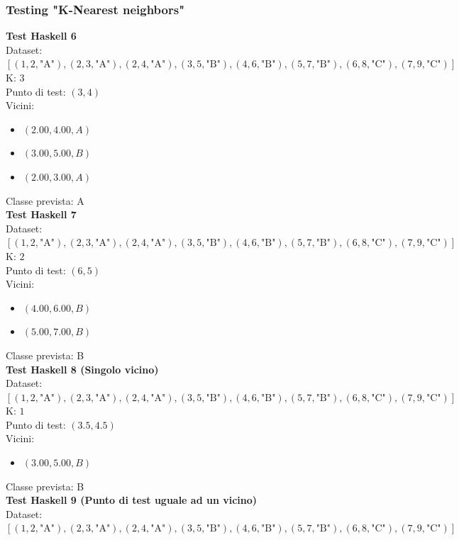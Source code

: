 \documentclass[11pt]{article}
\theoremstyle{definition}
\begin{document}
\subsubsection{Testing "K-Nearest neighbors"}
\textbf{Test Haskell 6}\\
Dataset: $[(1, 2, \text{"A"}), (2, 3, \text{"A"}), (2, 4, \text{"A"}), (3, 5, \text{"B"}), (4, 6, \text{"B"}), (5, 7, \text{"B"}), (6, 8, \text{"C"}), (7, 9, \text{"C"})]$\\
K: $3$\\
Punto di test: $(3, 4)$\\
Vicini:
\begin{itemize}
\item $(2.00,4.00, A)$
\item $(3.00,5.00, B)$
\item $(2.00,3.00, A)$
\end{itemize}
Classe prevista: A\\
\newline
\textbf{Test Haskell 7}\\
Dataset: $[(1, 2, \text{"A"}), (2, 3, \text{"A"}), (2, 4, \text{"A"}), (3, 5, \text{"B"}), (4, 6, \text{"B"}), (5, 7, \text{"B"}), (6, 8, \text{"C"}), (7, 9, \text{"C"})]$\\
K: $2$\\
Punto di test: $(6, 5)$\\
Vicini:
\begin{itemize}
\item $(4.00,6.00, B)$
\item $(5.00,7.00, B)$
\end{itemize}
Classe prevista: B\\
\newline
\textbf{Test Haskell 8 (Singolo vicino)}\\
Dataset: $[(1, 2, \text{"A"}), (2, 3, \text{"A"}), (2, 4, \text{"A"}), (3, 5, \text{"B"}), (4, 6, \text{"B"}), (5, 7, \text{"B"}), (6, 8, \text{"C"}), (7, 9, \text{"C"})]$\\
K: $1$\\
Punto di test: $(3.5, 4.5)$\\
Vicini:
\begin{itemize}
\item $(3.00,5.00, B)$
\end{itemize}
Classe prevista: B\\
\newline
\textbf{Test Haskell 9 (Punto di test uguale ad un vicino)}\\
Dataset: $[(1, 2, \text{"A"}), (2, 3, \text{"A"}), (2, 4, \text{"A"}), (3, 5, \text{"B"}), (4, 6, \text{"B"}), (5, 7, \text{"B"}), (6, 8, \text{"C"}), (7, 9, \text{"C"})]$\\
\end{document}
